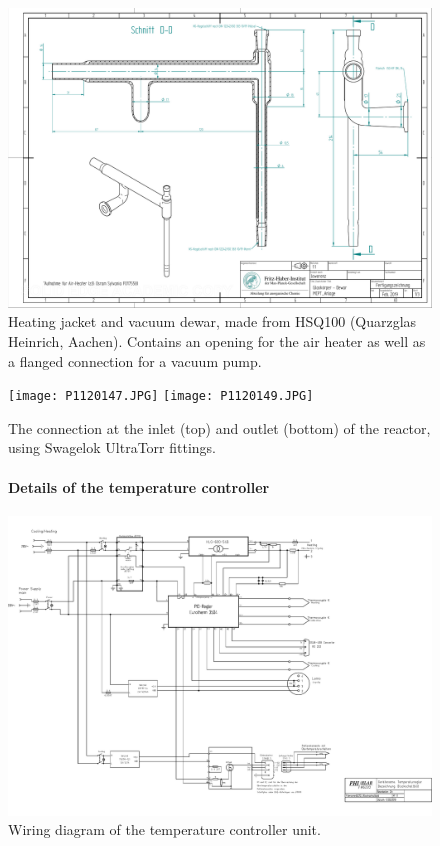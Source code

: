 \documentclass[12pt]{article}
\begin{document}
\begin{figure}[p]
\centering
\includegraphics[page=1, width=1.35\linewidth, angle=90]{dewar.pdf}
\caption{Heating jacket and vacuum dewar, made from HSQ100 (Quarzglas Heinrich, Aachen). Contains an opening for the air heater as well as a flanged connection for a vacuum pump. \label{dewar}}
\end{figure}

\begin{figure}[p]
\begin{center}
\texttt{[image: P1120147.JPG]}
\texttt{[image: P1120149.JPG]}
\caption{The connection at the inlet (top) and outlet (bottom) of the reactor, using Swagelok UltraTorr fittings. \label{reaccon}}
\end{center}
\end{figure}

\clearpage
\begin{figure}[p]
\paragraph{Details of the temperature controller}
\begin{center}
\includegraphics[width=1.3\linewidth, angle=90]{6220_Blockschaltbild.pdf}\vspace{1em}
\caption{Wiring diagram of the temperature controller unit. \label{eurothermA}}
\end{center}
\end{figure}
\clearpage
\end{document}
